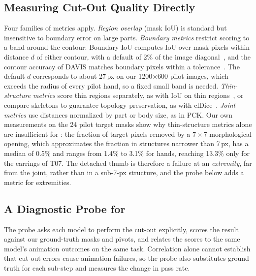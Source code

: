 \subsection{Measuring Cut-Out Quality Directly}
\label{sec:cutout-metrics}

Four families of metrics apply. \emph{Region overlap} (mask IoU) is standard but insensitive to boundary error on large parts. \emph{Boundary metrics} restrict scoring to a band around the contour: Boundary IoU computes IoU over mask pixels within distance $d$ of either contour, with a default of 2\% of the image diagonal~\citep{cheng2021boundaryiou}, and the contour accuracy of DAVIS matches boundary pixels within a tolerance~\citep{perazzi2016davis}. The default $d$ corresponds to about 27\,px on our 1200$\times$600 pilot images, which exceeds the radius of every pilot hand, so a fixed small band is needed. \emph{Thin-structure metrics} score thin regions separately, as with IoU on thin regions~\citep{liew2021thinobject}, or compare skeletons to guarantee topology preservation, as with clDice~\citep{shit2021cldice}. \emph{Joint metrics} use distances normalized by part or body size, as in PCK. Our own measurements on the 24 pilot target masks show why thin-structure metrics alone are insufficient for \anibench{}: the fraction of target pixels removed by a $7\times7$ morphological opening, which approximates the fraction in structures narrower than 7\,px, has a median of 0.5\% and ranges from 1.4\% to 3.1\% for hands, reaching 13.3\% only for the earrings of T07. The detached thumb is therefore a failure at an \emph{extremity}, far from the joint, rather than in a sub-7-px structure, and the probe below adds a metric for extremities.

\subsection{A Diagnostic Probe for \anibench{}}
\label{sec:cutout-probe}

The probe asks each model to perform the cut-out explicitly, scores the result against our ground-truth masks and pivots, and relates the scores to the same model's animation outcomes on the same task. Correlation alone cannot establish that cut-out errors cause animation failures, so the probe also substitutes ground truth for each sub-step and measures the change in pass rate.

